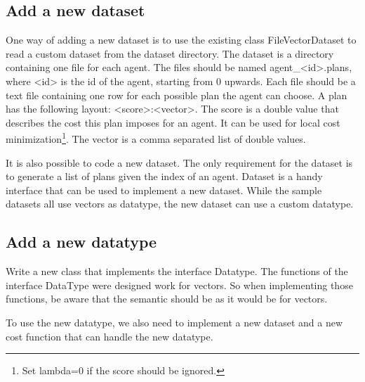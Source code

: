 \documentclass[11pt]{article} %
\newcommand{\code}{}
\begin{document}
\subsection{Add a new dataset} \label{sec:new_dataset}
One way of adding a new dataset is to use the existing class \code{FileVectorDataset} to read a custom dataset from the dataset directory. The dataset is a directory containing one file for each agent. The files should be named \code{agent\_<id>.plans}, where \code{<id>} is the id of the agent, starting from 0 upwards.
Each file should be a text file containing one row for each possible plan the agent can choose. A plan has the following layout: \code{<score>:<vector>}. The score is a double value that describes the cost this plan imposes for an agent. It can be used for local cost minimization\footnote{Set \code{lambda=0} if the score should be ignored.}. The vector is a comma separated list of double values.

It is also possible to code a new dataset. The only requirement for the dataset is to generate a list of plans given the index of an agent. \code{Dataset} is a handy interface that can be used to implement a new dataset. While the sample datasets all use vectors as datatype, the new dataset can use a custom datatype.

\subsection{Add a new datatype}
Write a new class that implements the interface \code{Datatype}. The functions of the interface \code{DataType} were designed work for vectors. So when implementing those functions, be aware that the semantic should be as it would be for vectors.

To use the new datatype, we also need to implement a new dataset and a new cost function that can handle the new datatype.

\end{document}
